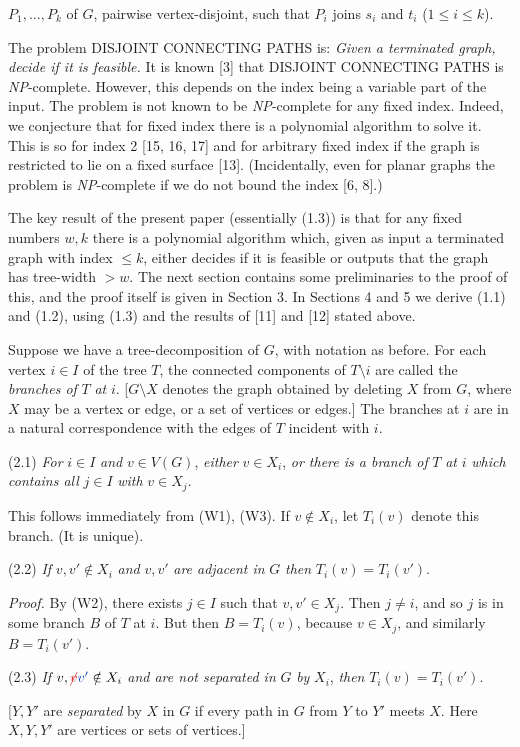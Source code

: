 \noindent $P_1, \dots, P_k$ of $G$, pairwise vertex-disjoint, such that $P_i$ joins $s_i$ and $t_i$ ($1 \le i \le k$).

The problem DISJOINT CONNECTING PATHS is: \textit{Given a terminated graph, decide if it is feasible.} It is known [3] that DISJOINT CONNECTING PATHS is \textit{NP}-complete. However, this depends on the index being a variable part of the input. The problem is not known to be \textit{NP}-complete for any fixed index. Indeed, we conjecture that for fixed index there is a polynomial algorithm to solve it. This is so for index 2 [15, 16, 17] and for arbitrary fixed index if the graph is restricted to lie on a fixed surface [13]. (Incidentally, even for planar graphs the problem is \textit{NP}-complete if we do not bound the index [6, 8].)

The key result of the present paper (essentially (1.3)) is that for any fixed numbers $w, k$ there is a polynomial algorithm which, given as input a terminated graph with index $\le k$, either decides if it is feasible or outputs that the graph has tree-width $> w$. The next section contains some preliminaries to the proof of this, and the proof itself is given in Section 3. In Sections 4 and 5 we derive (1.1) and (1.2), using (1.3) and the results of [11] and [12] stated above.


Suppose we have a tree-decomposition of $G$, with notation as before. For each vertex $i \in I$ of the tree $T$, the connected components of $T \setminus i$ are called the \textit{branches of} $T$ \textit{at} $i$. [$G \setminus X$ denotes the graph obtained by deleting $X$ from $G$, where $X$ may be a vertex or edge, or a set of vertices or edges.] The branches at $i$ are in a natural correspondence with the edges of $T$ incident with $i$.

\stmt
(2.1) \textit{For} $i \in I$ \textit{and} $v \in V(G)$, \textit{either} $v \in X_i$, \textit{or there is a branch of} $T$ \textit{at} $i$ \textit{which contains all} $j \in I$ \textit{with} $v \in X_j$.

This follows immediately from (W1), (W3). If $v \notin X_i$, let $T_i(v)$ denote this branch. (It is unique).

\stmt
(2.2) \textit{If} $v, v' \notin X_i$ \textit{and} $v, v'$ \textit{are adjacent in} $G$ \textit{then} $T_i(v) = T_i(v')$.

\textit{Proof.} By (W2), there exists $j \in I$ such that $v, v' \in X_j$. Then $j \ne i$, and so $j$ is in some branch $B$ of $T$ at $i$. But then $B = T_i(v)$, because $v \in X_j$, and similarly $B = T_i(v')$.

\stmt
(2.3) \textit{If} $v, \delm{v}\fix{v'} \notin X_i$ \textit{and are not separated in} $G$ \textit{by} $X_i$, \textit{then} $T_i(v) = T_i(v')$.

[$Y, Y'$ are \textit{separated} by $X$ in $G$ if every path in $G$ from $Y$ to $Y'$ meets $X$. Here $X, Y, Y'$ are vertices or sets of vertices.]
